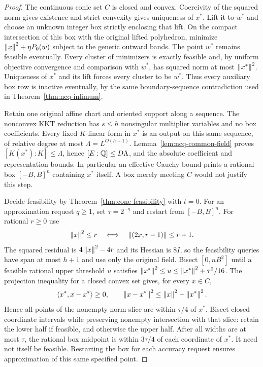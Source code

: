\begin{proof}
The continuous conic set $C$ is closed and convex. Coercivity of the
squared norm gives existence and strict convexity gives uniqueness of
$x^*$. Lift it to $w^*$ and choose an unknown integer box strictly
enclosing that lift. On the compact intersection of this box with the
original lifted polyhedron, minimize $\left\lVert x\right\rVert^2+\eta P_0(w)$ subject
to the generic outward bands. The point $w^*$ remains feasible eventually.
Every cluster of minimizers is exactly feasible and, by uniform objective
convergence and comparison with $w^*$, has squared norm at most
$\left\lVert x^*\right\rVert^2$. Uniqueness of $x^*$ and its lift forces every cluster
to be $w^*$. Thus every auxiliary box row is inactive eventually, by the
same boundary-sequence contradiction used in
Theorem~\ref{thm:ncq-infimum}.

Retain one original affine chart and oriented support along a sequence.
The nonconvex KKT reduction has $s\le h$ nonsingular multiplier
variables and no box coefficients. Every fixed $K$-linear form in $x^*$
is an output on this same sequence, of relative degree at most
$\Lambda=L^{O(h+1)}$. Lemma~\ref{lem:ncq-common-field} proves
$[K(x^*):K]\le\Lambda$, hence $[E:\mathbb Q]\le D\Lambda$, and the
absolute coefficient and representation bounds. In particular an effective
Cauchy bound prints a rational box $[-B,B]^n$ containing $x^*$ itself.
A box merely meeting $C$ would not justify this step.

Decide feasibility by Theorem~\ref{thm:cone-feasibility} with $t=0$.
For an approximation request $q\ge1$, set $\tau=2^{-q}$ and restart
from $[-B,B]^n$. For rational $r\ge0$ use
\begin{equation}
\label{eq:cone-norm-query}
 \left\lVert x\right\rVert^2\le r\quad\Longleftrightarrow\quad
                   \left\lVert(2x,r-1)\right\rVert\le r+1.
\end{equation}
The squared residual is $4\left\lVert x\right\rVert^2-4r$ and its Hessian is $8I$, so
the feasibility queries have span at most $h+1$ and use only the
original field. Bisect $[0,nB^2]$ until a feasible rational upper
threshold $u$ satisfies
$\left\lVert x^*\right\rVert^2\le u\le\left\lVert x^*\right\rVert^2+\tau^2/16$.
The projection inequality for a closed convex set gives, for every
$x\in C$,
\[
 \left\langle x^*,x-x^*\right\rangle\ge0,\qquad
 \left\lVert x-x^*\right\rVert^2\le\left\lVert x\right\rVert^2-\left\lVert x^*\right\rVert^2.
\]
Hence all points of the nonempty norm slice are within $\tau/4$ of
$x^*$. Bisect closed coordinate intervals while preserving nonempty
intersection with that slice: retain the lower half if feasible, and
otherwise the upper half. After all widths are at most $\tau$, the
rational box midpoint is within $3\tau/4$ of each coordinate of
$x^*$. It need not itself be feasible. Restarting the box for each
accuracy request ensures approximation of this same specified point.


\end{proof}
